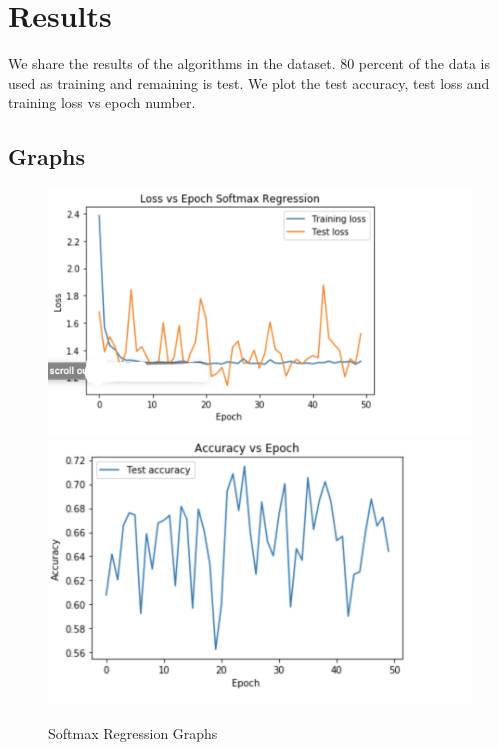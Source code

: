 \documentclass[10pt]{article}
\begin{document}
\section{Results}
We share the results of the algorithms in the dataset. 80 percent of the data is used as training and remaining is test. We plot the test accuracy, test loss and training loss vs epoch number. 
\subsection{Graphs}
\begin{figure}[h]
\centering
\includegraphics[scale=0.3]{LOSS SOFT}
\includegraphics[scale=0.3]{SOFT ACC}
\caption{Softmax Regression Graphs}
\end{figure}
\newpage
\end{document}
